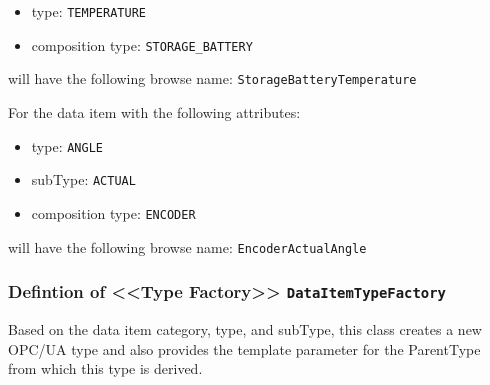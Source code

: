 \begin{itemize}
\begin{itemize}
\item type: \texttt{TEMPERATURE}
\item composition type: \texttt{STORAGE_BATTERY}
\end{itemize}

will have the following browse name: \texttt{StorageBatteryTemperature}

For the data item with the following attributes:

\begin{itemize}
\item type: \texttt{ANGLE}
\item subType: \texttt{ACTUAL}
\item composition type: \texttt{ENCODER}
\end{itemize}

will have the following browse name: \texttt{EncoderActualAngle}


\end{itemize}
\subsubsection{Defintion of <<Type Factory>> \texttt{DataItemTypeFactory}} \label{type:DataItemTypeFactory}

\FloatBarrier

Based on the data item category, type, and subType, this class creates a new OPC/UA type 
and also provides the template parameter for the ParentType from which this type is derived. 


